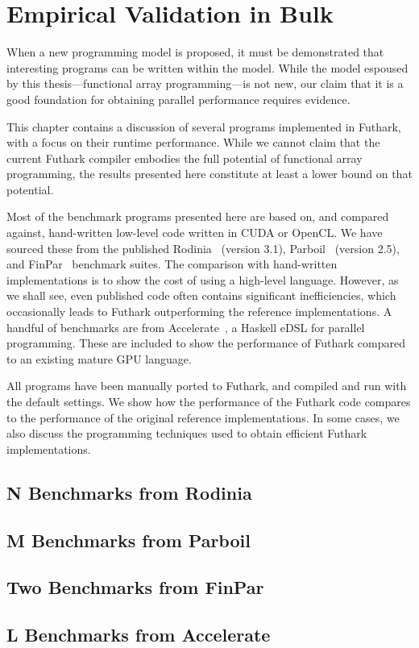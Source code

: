 \chapter{Empirical Validation in Bulk}
\label{chap:empirical-validation}

When a new programming model is proposed, it must be demonstrated that
interesting programs can be written within the model.  While the model
espoused by this thesis---functional array programming---is not new,
our claim that it is a good foundation for obtaining parallel
performance requires evidence.

This chapter contains a discussion of several programs implemented in
Futhark, with a focus on their runtime performance.  While we cannot
claim that the current Futhark compiler embodies the full potential of
functional array programming, the results presented here constitute at
least a lower bound on that potential.

Most of the benchmark programs presented here are based on, and
compared against, hand-written low-level code written in CUDA or
OpenCL.  We have sourced these from the published
Rodinia~\cite{5306797} (version 3.1),
Parboil~\cite{stratton2012parboil} (version 2.5), and
FinPar~\cite{FinPar:TACO} benchmark suites.  The comparison with
hand-written implementations is to show the cost of using a high-level
language.  However, as we shall see, even published code often
contains significant inefficiencies, which occasionally leads to
Futhark outperforming the reference implementations.  A handful of
benchmarks are from Accelerate~\cite{mcdonell2013optimising}, a
Haskell eDSL for parallel programming.  These are included to show the
performance of Futhark compared to an existing mature GPU language.

All programs have been manually ported to Futhark, and compiled and
run with the default settings.  We show how the performance of the
Futhark code compares to the performance of the original reference
implementations.  In some cases, we also discuss the programming
techniques used to obtain efficient Futhark implementations.

\section{N Benchmarks from Rodinia}

\section{M Benchmarks from Parboil}

\section{Two Benchmarks from FinPar}

\section{L Benchmarks from Accelerate}

